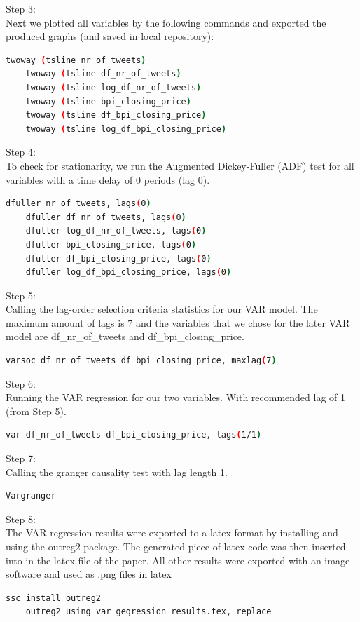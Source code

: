 \documentclass[a4paper,12pt]{article}
\begin{document}
\begin{spacing}{1.2}
Step 3:\\
Next we plotted all variables by the following commands and exported the produced graphs (and saved in local repository):\\
	\begin{lstlisting}[language=bash]
	twoway (tsline nr_of_tweets)
	twoway (tsline df_nr_of_tweets)
	twoway (tsline log_df_nr_of_tweets)
	twoway (tsline bpi_closing_price)
	twoway (tsline df_bpi_closing_price)
	twoway (tsline log_df_bpi_closing_price)
	\end{lstlisting}

Step 4:\\
To check for stationarity, we run the Augmented Dickey-Fuller (ADF) test for all variables with a time delay of 0 periods (lag 0).\\
	\begin{lstlisting}[language=bash]
	dfuller nr_of_tweets, lags(0)
	dfuller df_nr_of_tweets, lags(0)
	dfuller log_df_nr_of_tweets, lags(0)
	dfuller bpi_closing_price, lags(0)
	dfuller df_bpi_closing_price, lags(0)
	dfuller log_df_bpi_closing_price, lags(0)
	\end{lstlisting}

Step 5:\\
Calling the lag-order selection criteria statistics for our VAR model. The maximum amount of lags is 7 and the variables that we chose for the later VAR model are df\_nr\_of\_tweets and df\_bpi\_closing\_price.\\
	\begin{lstlisting}[language=bash]
	varsoc df_nr_of_tweets df_bpi_closing_price, maxlag(7)
	\end{lstlisting}

Step 6:\\
Running the VAR regression for our two variables. With recommended lag of 1 (from Step 5).\\
	\begin{lstlisting}[language=bash]
	var df_nr_of_tweets df_bpi_closing_price, lags(1/1)
	\end{lstlisting}

Step 7:\\
Calling the granger causality test with lag length 1.\\
	\begin{lstlisting}[language=bash]
	Vargranger
	\end{lstlisting}

Step 8:\\
The VAR regression results were exported to a latex format by installing and using the outreg2 package. The generated piece of latex code was then inserted into in the latex file of the paper. All other results were exported with an image software and used as .png files in latex\\
	\begin{lstlisting}[language=bash]
	ssc install outreg2
	outreg2 using var_gegression_results.tex, replace
	\end{lstlisting}

\end{spacing}
\clearpage
\end{document}
